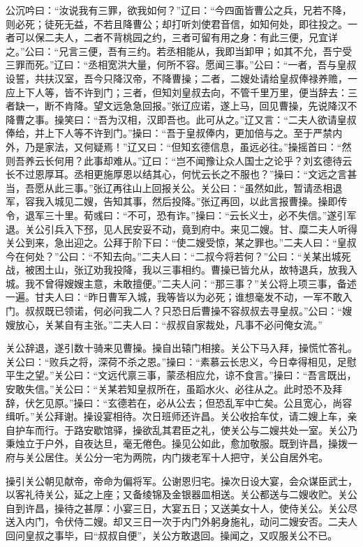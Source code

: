 公沉吟曰：“汝说我有三罪，欲我如何？”辽曰：“今四面皆曹公之兵，兄若不降，则必死；徒死无益，不若且降曹公；却打听刘使君音信，如知何处，即往投之。一者可以保二夫人，二者不背桃园之约，三者可留有用之身：有此三便，兄宜详之。”公曰：“兄言三便，吾有三约。若丞相能从，我即当卸甲；如其不允，吾宁受三罪而死。”辽曰：“丞相宽洪大量，何所不容。愿闻三事。”公曰：“一者，吾与皇叔设誓，共扶汉室，吾今只降汉帝，不降曹操；二者，二嫂处请给皇叔俸禄养赡，一应上下人等，皆不许到门；三者，但知刘皇叔去向，不管千里万里，便当辞去：三者缺一，断不肯降。望文远急急回报。”张辽应诺，遂上马，回见曹操，先说降汉不降曹之事。操笑曰：“吾为汉相，汉即吾也。此可从之。”辽又言：“二夫人欲请皇叔俸给，并上下人等不许到门。”操曰：“吾于皇叔俸内，更加倍与之。至于严禁内外，乃是家法，又何疑焉！”辽又曰：“但知玄德信息，虽远必往。”操摇首曰：“然则吾养云长何用？此事却难从。”辽曰：“岂不闻豫让众人国士之论乎？刘玄德待云长不过恩厚耳。丞相更施厚恩以结其心，何忧云长之不服也？”操曰：“文远之言甚当，吾愿从此三事。”张辽再往山上回报关公。关公曰：“虽然如此，暂请丞相退军，容我入城见二嫂，告知其事，然后投降。”张辽再回，以此言报曹操。操即传令，退军三十里。荀彧曰：“不可，恐有诈。”操曰：“云长义士，必不失信。”遂引军退。关公引兵入下邳，见人民安妥不动，竟到府中。来见二嫂。甘、糜二夫人听得关公到来，急出迎之。公拜于阶下曰：“使二嫂受惊，某之罪也。”二夫人曰：“皇叔今在何处？”公曰：“不知去向。”二夫人曰：“二叔今将若何？”公曰：“关某出城死战，被困土山，张辽劝我投降，我以三事相约。曹操已皆允从，故特退兵，放我入城。我不曾得嫂嫂主意，未敢擅便。”二夫人问：“那三事？”关公将上项三事，备述一遍。甘夫人曰：“昨日曹军入城，我等皆以为必死；谁想毫发不动，一军不敢入门。叔叔既已领诺，何必问我二人？只恐日后曹操不容叔叔去寻皇叔。”公曰：“嫂嫂放心，关某自有主张。”二夫人曰：“叔叔自家裁处，凡事不必问俺女流。”

关公辞退，遂引数十骑来见曹操。操自出辕门相接。关公下马入拜，操慌忙答礼。关公曰：“败兵之将，深荷不杀之恩。”操曰：“素慕云长忠义，今日幸得相见，足慰平生之望。”关公曰：“文远代禀三事，蒙丞相应允，谅不食言。”操曰：“吾言既出，安敢失信。”关公曰：“关某若知皇叔所在，虽蹈水火、必往从之。此时恐不及拜辞，伏乞见原。”操曰：“玄德若在，必从公去；但恐乱军中亡矣。公且宽心，尚容缉听。”关公拜谢。操设宴相待。次日班师还许昌。关公收拾车仗，请二嫂上车，亲自护车而行。于路安歇馆驿，操欲乱其君臣之礼，使关公与二嫂共处一室。关公乃秉烛立于户外，自夜达旦，毫无倦色。操见公如此，愈加敬服。既到许昌，操拨一府与关公居住。关公分一宅为两院，内门拨老军十人把守，关公自居外宅。

操引关公朝见献帝，帝命为偏将军。公谢恩归宅。操次日设大宴，会众谋臣武士，以客礼待关公，延之上座；又备绫锦及金银器皿相送。关公都送与二嫂收贮。关公自到许昌，操待之甚厚：小宴三日，大宴五日；又送美女十人，使侍关公。关公尽送入内门，令伏侍二嫂。却又三日一次于内门外躬身施礼，动问二嫂安否。二夫人回问皇叔之事毕，曰“叔叔自便”，关公方敢退回。操闻之，又叹服关公不已。

